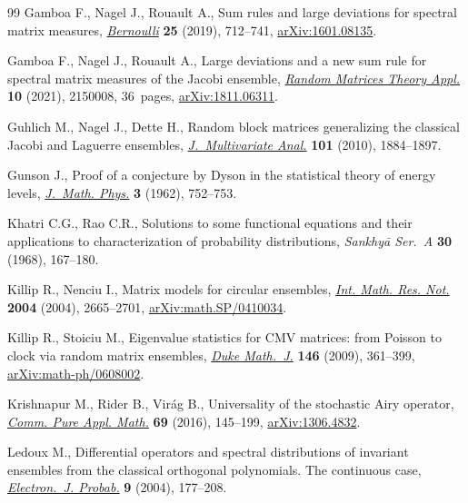 \documentclass[pdftex]{sigma}
\numberwithin{equation}{section}
\theoremstyle{definition}
\begin{document}
\begin{thebibliography}{99}
Gamboa F., Nagel J., Rouault A., Sum rules and large deviations for spectral
 matrix measures,
 \href{https://doi.org/10.3150/17-bej1003}{\textit{Bernoulli}} \textbf{25}
 (2019), 712--741, \href{http://arxiv.org/abs/1601.08135}{arXiv:1601.08135}.

Gamboa F., Nagel J., Rouault A., Large deviations and a new sum rule for
 spectral matrix measures of the {J}acobi ensemble,
 \href{https://doi.org/10.1142/S2010326321500088}{\textit{Random Matrices
 Theory Appl.}} \textbf{10} (2021), 2150008, 36~pages,
 \href{http://arxiv.org/abs/1811.06311}{arXiv:1811.06311}.

Guhlich M., Nagel J., Dette H., Random block matrices generalizing the
 classical {J}acobi and {L}aguerre ensembles,
 \href{https://doi.org/10.1016/j.jmva.2010.03.013}{\textit{J.~Multivariate
 Anal.}} \textbf{101} (2010), 1884--1897.

Gunson J., Proof of a conjecture by {D}yson in the statistical theory of energy
 levels, \href{https://doi.org/10.1063/1.1724277}{\textit{J.~Math. Phys.}}
 \textbf{3} (1962), 752--753.

Khatri C.G., Rao C.R., Solutions to some functional equations and their
 applications to characterization of probability distributions,
 \textit{Sankhy\={a} Ser.~A} \textbf{30} (1968), 167--180.

Killip R., Nenciu I., Matrix models for circular ensembles,
 \href{https://doi.org/10.1155/S1073792804141597}{\textit{Int. Math. Res.
 Not.}} \textbf{2004} (2004), 2665--2701,
 \href{http://arxiv.org/abs/math.SP/0410034}{arXiv:math.SP/0410034}.

Killip R., Stoiciu M., Eigenvalue statistics for {CMV} matrices: from {P}oisson
 to clock via random matrix ensembles,
 \href{https://doi.org/10.1215/00127094-2009-001}{\textit{Duke Math.~J.}}
 \textbf{146} (2009), 361--399,
 \href{http://arxiv.org/abs/math-ph/0608002}{arXiv:math-ph/0608002}.

Krishnapur M., Rider B., Vir\'ag B., Universality of the stochastic {A}iry
 operator, \href{https://doi.org/10.1002/cpa.21573}{\textit{Comm. Pure Appl.
 Math.}} \textbf{69} (2016), 145--199,
 \href{http://arxiv.org/abs/1306.4832}{arXiv:1306.4832}.

Ledoux M., Differential operators and spectral distributions of invariant
 ensembles from the classical orthogonal polynomials. {T}he continuous case,
 \href{https://doi.org/10.1214/EJP.v9-191}{\textit{Electron.~J. Probab.}}
 \textbf{9} (2004), 177--208.


\end{thebibliography}
\end{document}
